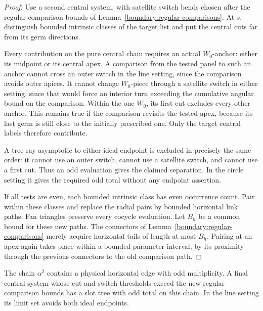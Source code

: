 \begin{proof}
Use a second central system, with satellite switch bends chosen after the
regular comparison bounds of Lemma~\ref{boundary:regular-comparisons}.
At $s$, distinguish bounded intrinsic classes of the target list and put
the central cuts far from its germ directions.

Every contribution on the pure central chain requires an actual
$W_0$-anchor: either its midpoint or its central apex. A comparison from
the tested panel to such an anchor cannot cross an outer switch in the
line setting, since the comparison avoids outer apices. It cannot change
$W_0$-piece through a satellite switch in either setting, since that would
force an interior turn exceeding the cumulative angular bound on the
comparison. Within the one $W_0$, its first cut excludes every other
anchor. This remains true if the comparison revisits the tested apex,
because its last germ is still close to the initially prescribed one.
Only the target central labels therefore contribute.

A tree ray asymptotic to either ideal endpoint is excluded in precisely
the same order: it cannot use an outer switch, cannot use a satellite
switch, and cannot use a first cut. Thus an odd evaluation gives the
claimed separation. In the circle setting it gives the required odd total
without any endpoint assertion.

If all tests are even, each bounded intrinsic class has even occurrence
count. Pair within these classes and replace the radial pairs by bounded
horizontal link paths. Fan triangles preserve every cocycle evaluation.
Let $B_h$ be a common bound for these new paths. The connectors of
Lemma~\ref{boundary:regular-comparisons} merely acquire horizontal tails
of length at most $B_h$. Pairing at an apex again takes place within a
bounded parameter interval, by its proximity through the previous
connectors to the old comparison path.
\end{proof}

\begin{lemma}\label{boundary:horizontal-parity}
The chain $\alpha^2$ contains a physical horizontal edge with odd
multiplicity. A final central system whose cut and switch thresholds
exceed the new regular comparison bounds has a slot tree with odd total
on this chain. In the line setting its limit set avoids both ideal
endpoints.
\end{lemma}

